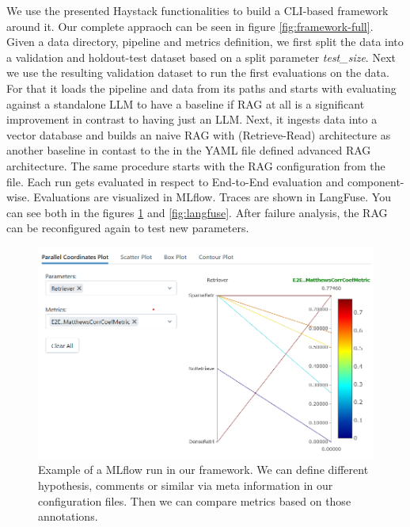 We use the presented Haystack functionalities to build a CLI-based framework around it. Our complete appraoch can be seen in figure \ref{fig:framework-full}. Given a data directory, pipeline and metrics definition, we first split the data into a validation and holdout-test dataset based on a split parameter \textit{test\_size}. Next we use the resulting validation dataset to run the first evaluations on the data. For that it loads the pipeline and data from its paths and starts with evaluating against a standalone LLM to have a baseline if RAG at all is a significant improvement in contrast to having just an LLM. Next, it ingests data into a vector database and builds an naive RAG with (Retrieve-Read) architecture as another baseline in contast to the in the YAML file defined advanced RAG architecture. The same procedure starts with the RAG configuration from the file. Each run gets evaluated in respect to End-to-End evaluation and component-wise. Evaluations are visualized in MLflow. Traces are shown in LangFuse. You can see both in the figures \ref{fig:mlflow} and \ref{fig:langfuse}. After failure analysis, the RAG can be reconfigured again to test new parameters. 

\begin{figure}
  \centering
  \includegraphics[width=\textwidth]{images/MLFlow-Vis.png}
  \caption{Example of a MLflow run in our framework. We can define different hypothesis, comments or similar via meta information in our configuration files. Then we can compare metrics based on those annotations.}
  \label{fig:mlflow}
\end{figure}

